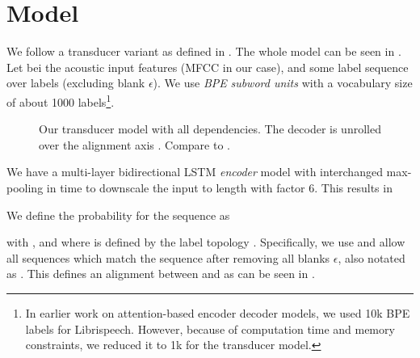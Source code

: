 \documentclass[a4paper]{article}
\newcommand{\blank}{\ensuremath{\epsilon}}
\begin{document}
\section{Model}

We follow a transducer variant as defined in \cite{zeyer2020:transducer}.
The whole model can be seen in .
Let  bei the acoustic input features (MFCC in our case),
and  some label sequence over labels 
(excluding blank \blank).
We use \emph{BPE} \emph{subword units}
\cite{sennrich2015neuralbpe,zeyer2018:asr-attention}
with a vocabulary size of about 1000 labels\footnote{In earlier work on attention-based encoder decoder models,
we used 10k BPE labels for Librispeech.
However, because of computation time and memory constraints,
we reduced it to 1k for the transducer model.}.

\begin{figure}
\caption[Transducer model]{Our transducer model with all dependencies.
The decoder is unrolled over the alignment axis .
Compare to \cite{zeyer2020:transducer}.}
\label{fig:librispeech_transducer}
\end{figure}

We have a multi-layer bidirectional LSTM \cite{hochreiter1997lstm} \emph{encoder} model
with interchanged max-pooling in time to downscale the input to length 
with factor 6.
This results in


We define the probability for the sequence  as

with ,
and where  is defined by the label topology .
Specifically, we use  and allow all sequences 
which match the sequence  after removing all blanks \blank,
also notated as .
This defines an alignment between  and 
as can be seen in .
\end{document}
